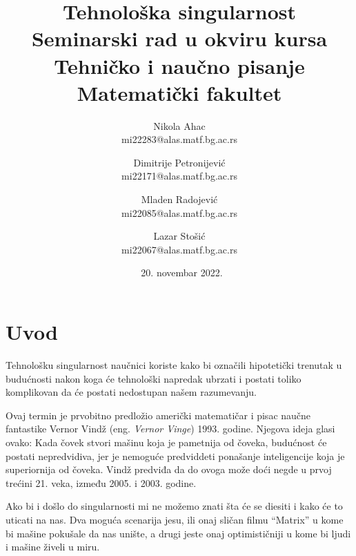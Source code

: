 \documentclass[a4paper]{article}
\begin{document}
\title{Tehnološka singularnost\\ \small{Seminarski rad u okviru kursa\\Tehničko i naučno pisanje\\ Matematički fakultet}}

\author{Nikola Ahac\\ mi22283@alas.matf.bg.ac.rs \and Dimitrije Petronijević\\ mi22171@alas.matf.bg.ac.rs \and Mladen Radojević \\ mi22085@alas.matf.bg.ac.rs \and Lazar Stošić \\ mi22067@alas.matf.bg.ac.rs}

\date{~20. novembar 2022.}

\maketitle


\tableofcontents

\newpage

\section{Uvod}
\label{sec:uvod}
Tehnološku singularnost naučnici koriste kako bi označili hipotetički trenutak u budućnosti nakon koga će tehnološki napredak ubrzati i postati toliko komplikovan da će postati nedostupan našem razumevanju. 

Ovaj termin je prvobitno predložio američki matematičar i pisac naučne fantastike  Vernor Vindž (eng. \textit{Vernor Vinge}) 1993. godine. Njegova ideja glasi ovako: Kada čovek stvori mašinu koja je pametnija od čoveka, budućnost će postati nepredvidiva, jer je nemoguće predviddeti ponašanje inteligencije koja je superiornija od čoveka. Vindž predviđa da do ovoga može doći negde u prvoj trećini 21. veka, između 2005. i 2003. godine. 

Ako bi i došlo do singularnosti mi ne možemo znati šta će se diesiti i kako će to uticati na nas. Dva moguća scenarija jesu, ili onaj sličan filmu “Matrix” u kome bi mašine pokušale da nas unište, a drugi jeste onaj optimističniji u kome bi ljudi i mašine živeli u miru.
\end{document}
